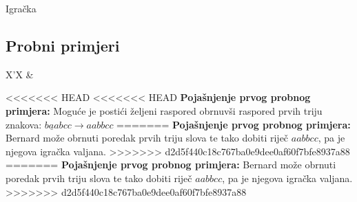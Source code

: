 \begin{statement}[
  problempoints=100,
  timelimit=1 sekunda,
  memorylimit=512 MiB,
]{Igračka}
\subsection*{Probni primjeri}
\begin{tabularx}{\textwidth}{X'X}
 &
\end{tabularx}

<<<<<<< HEAD
<<<<<<< HEAD
\textbf{Pojašnjenje prvog probnog primjera:}
Moguće je postići željeni raspored obrnuvši raspored prvih triju znakova:
$\underline{baa}bcc \rightarrow aabbcc$
=======
\textbf{Pojašnjenje prvog probnog primjera:} Bernard može obrnuti poredak
prvih triju slova te tako dobiti riječ $aabbcc$, pa je njegova igračka
valjana.
>>>>>>> d2d5f440c18c767ba0e9dee0af60f7bfe8937a88
=======
\textbf{Pojašnjenje prvog probnog primjera:} Bernard može obrnuti poredak
prvih triju slova te tako dobiti riječ $aabbcc$, pa je njegova igračka
valjana.
>>>>>>> d2d5f440c18c767ba0e9dee0af60f7bfe8937a88

\end{statement}

